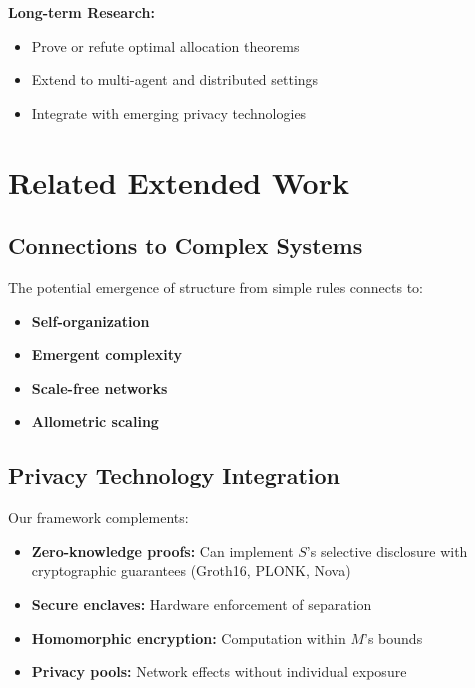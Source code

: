 \documentclass[11pt,a4paper]{article}
\theoremstyle{definition}
\begin{document}
\textbf{Long-term Research:}

\begin{itemize}
    \item Prove or refute optimal allocation theorems
    \item Extend to multi-agent and distributed settings
    \item Integrate with emerging privacy technologies
\end{itemize}

\section{Related Extended Work}

\subsection{Connections to Complex Systems}

The potential emergence of structure from simple rules connects to:

\begin{itemize}
    \item \textbf{Self-organization} \cite{prigogine1984}
    \item \textbf{Emergent complexity} \cite{kauffman1993}
    \item \textbf{Scale-free networks} \cite{barabasi2002}
    \item \textbf{Allometric scaling} \cite{west2017}
\end{itemize}

\subsection{Privacy Technology Integration}

Our framework complements:

\begin{itemize}
    \item \textbf{Zero-knowledge proofs:} Can implement $S$'s selective disclosure with cryptographic guarantees (Groth16, PLONK, Nova)
    \item \textbf{Secure enclaves:} Hardware enforcement of separation
    \item \textbf{Homomorphic encryption:} Computation within $M$'s bounds
    \item \textbf{Privacy pools:} Network effects without individual exposure
\end{itemize}
\end{document}
